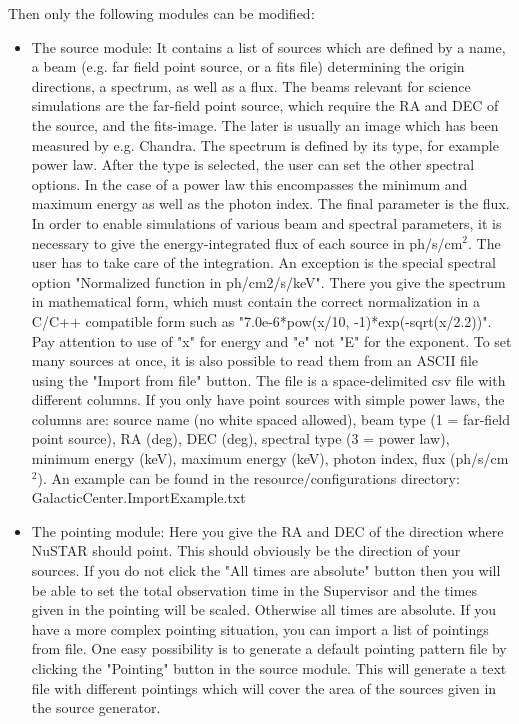 Then only the following modules can be modified:
\begin{itemize}
\item The source module: 
It contains a list of sources which are defined by a name, a beam (e.g. far field point source, or a fits file) determining the origin directions, a spectrum, as well as a flux.
The beams relevant for science simulations are the far-field point source, which require the RA and DEC of the source, and the fits-image. The later is usually an image which has been measured by e.g. Chandra.
The spectrum is defined by its type, for example power law. 
After the type is selected, the user can set the other spectral options.
In the case of a power law this encompasses the minimum and maximum energy as well as the photon index.
The final parameter is the flux.
In order to enable simulations of various beam and spectral parameters, it is necessary to give the energy-integrated flux of each source in ph/s/cm$^2$. 
The user has to take care of the integration.
An exception is the special spectral option "Normalized function in ph/cm2/s/keV". 
There you give the spectrum in mathematical form, which must contain the correct normalization in a C/C++ compatible form such as "7.0e-6*pow(x/10, -1)*exp(-sqrt(x/2.2))".
Pay attention to use of "x" for energy and "e" not "E" for the exponent.
To set many sources at once, it is also possible to read them from an ASCII file using the "Import from file" button. 
The file is a space-delimited csv file with different columns. If you only have point sources with simple power laws, the columns are: source name (no white spaced allowed), beam type (1 = far-field point source), RA (deg), DEC (deg), spectral type (3 = power law), minimum energy (keV), maximum energy (keV), photon index, flux (ph/s/cm$^2$).
An example can be found in the resource/configurations directory: GalacticCenter.ImportExample.txt
\item The pointing module: 
Here you give the RA and DEC of the direction where NuSTAR should point. 
This should obviously be the direction of your sources.
If you do not click the "All times are absolute" button then you will be able to set the total observation time in the Supervisor and the times given in the pointing will be scaled.
Otherwise all times are absolute. 
If you have a more complex pointing situation, you can import a list of pointings from file.
One easy possibility is to generate a default pointing pattern file by clicking the "Pointing" button in the source module. 
This will generate a text file with different pointings which will cover the area of the sources given in the source generator.

\end{itemize}
